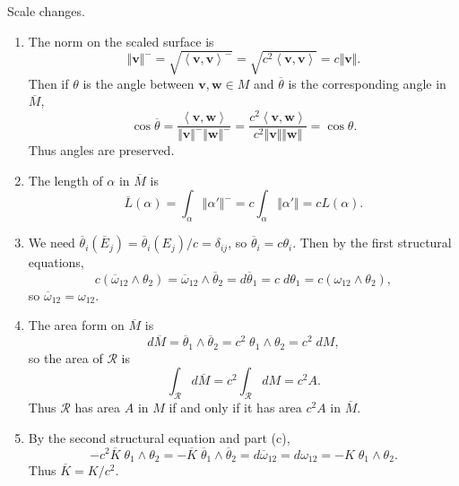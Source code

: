 \documentclass[10pt]{report}
\begin{document}
\pagebreak
\begin{exer}[7.2: 7]
Scale changes.
\end{exer}
\begin{enumerate}
	\item The norm on the scaled surface is
		\[
		{\Vert{\mathbf{v}}\Vert}^{-} = \sqrt{\left\langle \mathbf{v},\mathbf{v} \right\rangle^{-}} = \sqrt{c^2 \left\langle \mathbf{v},\mathbf{v} \right\rangle} = c{\Vert{\mathbf{v}}\Vert}.
		\] Then if $\theta$ is the angle between $\mathbf{v},\mathbf{w} \in M$ and $\overline{\theta} $ is the corresponding angle in $\overline{M}$,
		\[
		\cos \overline{\theta} = \frac{\left\langle \mathbf{v},\mathbf{w} \right\rangle}{{\Vert{\mathbf{v}}\Vert}^{-}{\Vert{\mathbf{w}}\Vert}^{-}} = \frac{c^2\left\langle \mathbf{v},\mathbf{w} \right\rangle}{c^2 {\Vert{\mathbf{v}}\Vert}{\Vert{\mathbf{w}}\Vert}} = \cos \theta.
		\] Thus angles are preserved.

	\item The length of $\alpha$ in $\overline{M}$ is
		\[
			\overline{L}(\alpha) = \int_{\alpha} {\Vert{\alpha'}\Vert}^{-} = c \int_{\alpha} {\Vert{\alpha'}\Vert} = c L(\alpha).
		\] 

	\item We need $\overline{\theta}_i(\overline{E}_{j})= \overline{\theta}_i(E_j)/c =\delta_{ij}$, so $\overline{\theta}_i = c\theta_i$. Then by the first structural equations,
		\[
			c(\overline{\omega}_{12} \wedge \theta_2) = \overline{\omega}_{12} \wedge \overline{\theta}_2 = d \overline{\theta}_1 = c\;d\theta_1 = c(\omega_{12}\wedge \theta_2),
		\] so $\overline{\omega}_{12}=\omega_{12}$.

	\item The area form on $\overline{M}$ is
		\[
			d\overline{M} = \overline{\theta}_1 \wedge \overline{\theta}_2 = c^2\;\theta_1 \wedge \theta_2 = c^2 \;dM,
		\] so the area of $\mathscr{R}$ is
		\[
		\int_{\mathscr{R}} d\overline{M} = c^2 \int_{\mathscr{R}} dM = c^2 A.
		\] 
		Thus $\mathscr{R}$ has area $A$ in $M$ if and only if it has area $c^2 A$ in $\overline{M}$.

	\item By the second structural equation and part (c),
		\[
			-c^2 \overline{K} \; \theta_1 \wedge \theta_2 = -\overline{K}\;\overline{\theta}_1 \wedge \overline{\theta}_2 = d \overline{\omega}_{12} = d\omega_{12} = -K\;\theta_1\wedge \theta_2.
		\] Thus $\overline{K}=K/c^2$.
\end{enumerate}
\end{document}
